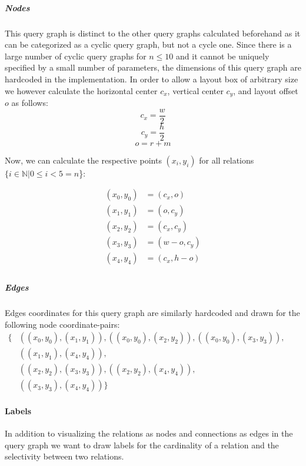 \subparagraph{Nodes} This query graph is distinct to the other query graphs calculated beforehand as it can be categorized as a cyclic query graph, but not a cycle one. Since there is a large number of cyclic query graphs for $n \leq 10$ and it cannot be uniquely specified by a small number of parameters, the dimensions of this query graph are hardcoded in the implementation. In order to allow a layout box of arbitrary size we however calculate the horizontal center $c_x$, vertical center $c_y$, and layout offset $o$ as follows:
\begin{equation}
    c_x = \frac{w}{2}
\end{equation}
\begin{equation}
    c_y = \frac{h}{2}
\end{equation}
\begin{equation}
    o = r + m
\end{equation}

Now, we can calculate the respective points $(x_i, y_i)$ for all relations $\{i \in \mathbb{N} \vert 0 \leq i < 5 = n$\}:

\begin{equation}
    \begin{aligned}
        (x_0, y_0) &= (c_x,o)\\
        (x_1, y_1) &= (o,c_y)\\
        (x_2, y_2) &= (c_x,c_y)\\
        (x_3, y_3) &= (w-o,c_y)\\
        (x_4, y_4) &= (c_x,h-o)\\
    \end{aligned}
\end{equation}

\subparagraph{Edges}
Edges coordinates for this query graph are similarly hardcoded and drawn for the following node coordinate-pairs:\\

$
\begin{aligned}
    \{& ((x_0,y_0), (x_1, y_1)), ((x_0, y_0), (x_2, y_2)), ((x_0, y_0), (x_3,y_3)),\\
      & ((x_1, y_1),(x_4, y_4)),\\
      & ((x_2, y_2),(x_3, y_3)), ((x_2,y_2),(x_4, y_4)),\\
      & ((x_3, y_3),(x_4, y_4)) \}    
\end{aligned}
$

\paragraph{Labels}
In addition to visualizing the relations as nodes and connections as edges in the query graph we want to draw labels for the cardinality of a relation and the selectivity between two relations.

